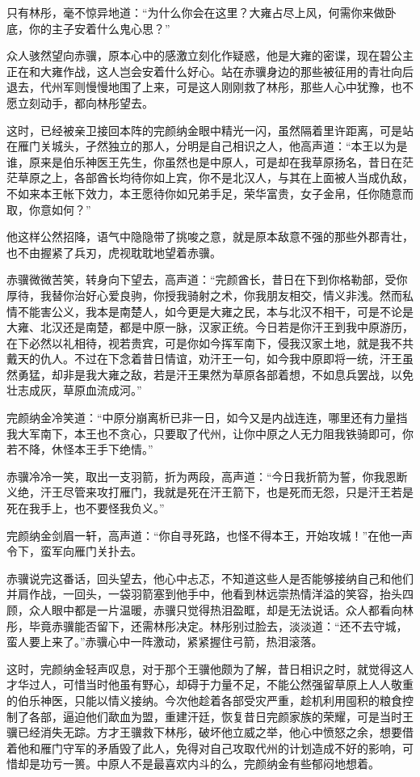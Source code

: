 只有林彤，毫不惊异地道：“为什么你会在这里？大雍占尽上风，何需你来做卧底，你的主子安着什么鬼心思？”

众人骇然望向赤骥，原本心中的感激立刻化作疑惑，他是大雍的密谍，现在碧公主正在和大雍作战，这人岂会安着什么好心。站在赤骥身边的那些被征用的青壮向后退去，代州军则慢慢地围了上来，可是这人刚刚救了林彤，那些人心中犹豫，也不愿立刻动手，都向林彤望去。

这时，已经被亲卫接回本阵的完颜纳金眼中精光一闪，虽然隔着里许距离，可是站在雁门关城头，孑然独立的那人，分明是自己相识之人，他高声道：“本王以为是谁，原来是伯乐神医王先生，你虽然也是中原人，可是却在我草原扬名，昔日在茫茫草原之上，各部酋长均待你如上宾，你不是北汉人，与其在上面被人当成仇敌，不如来本王帐下效力，本王愿待你如兄弟手足，荣华富贵，女子金帛，任你随意而取，你意如何？”

他这样公然招降，语气中隐隐带了挑唆之意，就是原本敌意不强的那些外郡青壮，也不由握紧了兵刃，虎视耽耽地望着赤骥。

赤骥微微苦笑，转身向下望去，高声道：“完颜酋长，昔日在下到你格勒部，受你厚待，我替你治好心爱良驹，你授我骑射之术，你我朋友相交，情义非浅。然而私情不能害公义，我本是南楚人，如今更是大雍之民，本与北汉不相干，可是不论是大雍、北汉还是南楚，都是中原一脉，汉家正统。今日若是你汗王到我中原游历，在下必然以礼相待，视若贵宾，可是你如今挥军南下，侵我汉家土地，就是我不共戴天的仇人。不过在下念着昔日情谊，劝汗王一句，如今我中原即将一统，汗王虽然勇猛，却非是我大雍之敌，若是汗王果然为草原各部着想，不如息兵罢战，以免壮志成灰，草原血流成河。”

完颜纳金冷笑道：“中原分崩离析已非一日，如今又是内战连连，哪里还有力量挡我大军南下，本王也不贪心，只要取了代州，让你中原之人无力阻我铁骑即可，你若不降，休怪本王手下绝情。”

赤骥冷冷一笑，取出一支羽箭，折为两段，高声道：“今日我折箭为誓，你我恩断义绝，汗王尽管来攻打雁门，我就是死在汗王箭下，也是死而无怨，只是汗王若是死在我手上，也不要怪我负义。”

完颜纳金剑眉一轩，高声道：“你自寻死路，也怪不得本王，开始攻城！”在他一声令下，蛮军向雁门关扑去。

赤骥说完这番话，回头望去，他心中忐忑，不知道这些人是否能够接纳自己和他们并肩作战，一回头，一袋羽箭塞到他手中，他看到林远崇热情洋溢的笑容，抬头四顾，众人眼中都是一片温暖，赤骥只觉得热泪盈眶，却是无法说话。众人都看向林彤，毕竟赤骥能否留下，还需林彤决定。林彤别过脸去，淡淡道：“还不去守城，蛮人要上来了。”赤骥心中一阵激动，紧紧握住弓箭，热泪滚落。

这时，完颜纳金轻声叹息，对于那个王骥他颇为了解，昔日相识之时，就觉得这人才华过人，可惜当时他虽有野心，却碍于力量不足，不能公然强留草原上人人敬重的伯乐神医，只能以情义接纳。今次他趁着各部受灾严重，趁机利用囤积的粮食控制了各部，逼迫他们歃血为盟，重建汗廷，恢复昔日完颜家族的荣耀，可是当时王骥已经消失无踪。方才王骥救下林彤，破坏他立威之举，他心中愤怒之余，想要借着他和雁门守军的矛盾毁了此人，免得对自己攻取代州的计划造成不好的影响，可惜却是功亏一篑。中原人不是最喜欢内斗的么，完颜纳金有些郁闷地想着。

